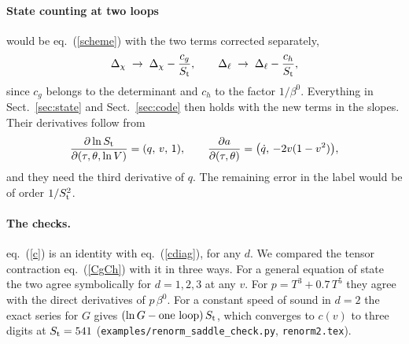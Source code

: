 \documentclass[11pt,aps,preprint,nofootinbib,superscriptaddress,tightenlines]{revtex4-2}
\def\st{\begin{equation}}
\def\stp{\end{equation}}
\def\Eq#1{eq.~(\ref{#1})}
\def\Sect#1{Sect.~\ref{#1}}
\let\oldparagraph\paragraph
\renewcommand{\paragraph}{\par\bigskip\oldparagraph}
\begin{document}
\paragraph{State counting at two loops} would be \Eq{scheme} with the two terms corrected separately,
\st
\Delta_\chi\;\to\;\Delta_\chi-\frac{c_g}{S_{\rm t}},\qquad \Delta_\ell\;\to\;\Delta_\ell-\frac{c_h}{S_{\rm t}} ,
\stp
since $c_g$ belongs to the determinant and $c_h$ to the factor $1/\beta^0$.  Everything in \Sect{sec:state} and \Sect{sec:code} then holds with the new
terms in the slopes.  Their derivatives follow from
\st
\frac{\partial\ln S_{\rm t}}{\partial(\tau,\theta,\ln V)}=(q,\,v,\,1),\qquad \frac{\partial a}{\partial(\tau,\theta)}=\big(\dot q,\,-2v(1-v^2)\big) ,
\stp
and they need the third derivative of $q$.  The remaining error in the label would be of order $1/S_{\rm t}^2$.

\paragraph{The checks.}  \Eq{c} is an identity with \Eq{cdiag}, for any $d$.  We compared the tensor contraction \Eq{CgCh} with it in three ways.  For
a general equation of state the two agree symbolically for $d=1,2,3$ at any $v$.  For $p=T^3+0.7\,T^5$ they agree with the direct derivatives of
$p\,\beta^0$.  For a constant speed of sound in $d=2$ the exact series for $G$ gives $(\ln G-\text{one loop})\,S_{\rm t}$, which converges to $c(v)$
to three digits at $S_{\rm t}=541$ (\nolinkurl{examples/renorm_saddle_check.py}, \nolinkurl{renorm2.tex}).
\end{document}
